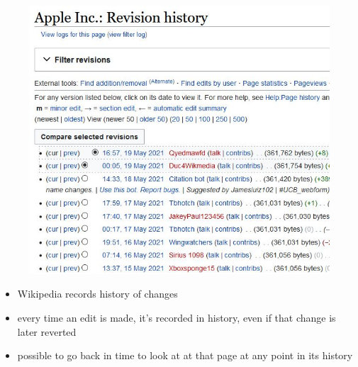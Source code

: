 \documentclass[english,14pt]{beamer}
\begin{document}
\begin{frame}[fragile]

\frametitle{}

\vspace*{-5mm}

\begin{figure}[ht]
	\centering
	\includegraphics[width=.45\textwidth]{figures/AppleWiki}
\end{figure}

\vspace*{-5mm}

\begin{itemize}
	\item Wikipedia records history of changes
	\item every time an edit is made, it's recorded in history, even if that change is later reverted
	\item possible to go back in time to look at at that page at any point in its history
\end{itemize}

\end{frame}

\end{document}
